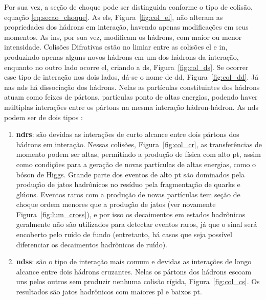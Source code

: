 Por sua vez, a seção de choque pode ser distinguida conforme o tipo de colisão,
equação \ref{eq:secao_choque}. As \glspl{el}, Figura~\ref{fig:col_el},
não alteram as propriedades dos hádrons em interação, havendo apenas 
modificações em seus momentos. As
\glspl{in}, por sua vez, modificam os hádrons, com maior ou menor intensidade. 
Colisões Difrativas estão no limiar entre as colisões \gls{el} e \acrshort{in},
produzindo apenas alguns novos hádrons em um dos hádrons da interação, enquanto no outro
lado ocorre \gls{el}, criando a \gls{ds}, Figura~\ref{fig:col_ds}. 
Se ocorrer esse tipo de interação nos dois lados, dá-se o nome de \gls{dd},
Figura~\ref{fig:col_dd}. Já nas \glspl{nd}
há dissociação dos hádrons. Nelas as partículas constituintes dos
hádrons atuam como feixes de pártons, partículas ponto de altas energias, podendo haver
múltiplas interações entre os pártons na mesma interação hádron-hádron. 
As \glspl{nd} podem ser de dois tipos \cite{THESIS_LAR,Underlying}:
\begin{enumerate}
\item \textbf{\glspl{ndr}}:
são devidas as interações de curto alcance entre dois pártons dos hádrons em
interação. Nessas colisões, Figura~\ref{fig:col_cr}, as transferências de momento podem ser altas,
permitindo a produção de física com alto \gls{pt}, 
assim como condições para a geração de novas partículas de altas
energias, como o bóson de Higgs. Grande parte dos eventos de alto \gls{pt} são
dominados pela produção de jatos hadrônicos no resíduo pela fragmentação de
quarks e glúons. Eventos raros com a produção de novas partículas tem seção de
choque ordem menores que a produção de jatos (ver novamente
Figura~\ref{fig:lum_cross}), e por isso os decaimentos em
estados hadrônicos geralmente não são utilizados para detectar eventos
raros, já que o sinal será encoberto pelo ruído de fundo (entretanto, há casos
que seja possível diferenciar os decaimentos hadrônicos de ruído). 
\item \textbf{\glspl{nds}}: 
são o tipo de interação mais comum e devidas as interações de longo alcance entre
dois hádrons cruzantes. Nelas os pártons dos hádrons escoam uns pelos outros sem produzir
nenhuma colisão rígida, Figura~\ref{fig:col_cs}. Os resultados são jatos
hadrônicos com maiores \gls{pl} e baixos \gls{pt}.
\end{enumerate}

